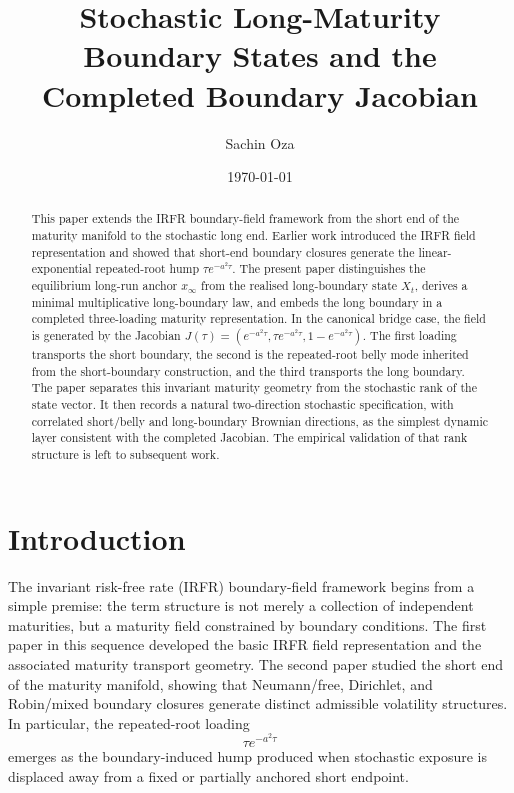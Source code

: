\documentclass[11pt]{article}
\title{Stochastic Long-Maturity Boundary States and the Completed Boundary Jacobian}
\author{Sachin Oza}
\date{\today}
\begin{document}
\maketitle

\begin{abstract}
This paper extends the IRFR boundary-field framework from the short end of the maturity manifold to the stochastic long end. Earlier work introduced the IRFR field representation and showed that short-end boundary closures generate the linear-exponential repeated-root hump \(\tau e^{-a^2\tau}\). The present paper distinguishes the equilibrium long-run anchor \(x_\infty\) from the realised long-boundary state \(X_t\), derives a minimal multiplicative long-boundary law, and embeds the long boundary in a completed three-loading maturity representation. In the canonical bridge case, the field is generated by the Jacobian \(J(\tau)=(e^{-a^2\tau},\tau e^{-a^2\tau},1-e^{-a^2\tau})\). The first loading transports the short boundary, the second is the repeated-root belly mode inherited from the short-boundary construction, and the third transports the long boundary. The paper separates this invariant maturity geometry from the stochastic rank of the state vector. It then records a natural two-direction stochastic specification, with correlated short/belly and long-boundary Brownian directions, as the simplest dynamic layer consistent with the completed Jacobian. The empirical validation of that rank structure is left to subsequent work.
\end{abstract}


\section{Introduction}

The invariant risk-free rate (IRFR) boundary-field framework begins from a simple premise: the term structure is not merely a collection of independent maturities, but a maturity field constrained by boundary conditions. The first paper in this sequence developed the basic IRFR field representation and the associated maturity transport geometry. The second paper studied the short end of the maturity manifold, showing that Neumann/free, Dirichlet, and Robin/mixed boundary closures generate distinct admissible volatility structures. In particular, the repeated-root loading
\[
\tau e^{-a^2\tau}
\]
emerges as the boundary-induced hump produced when stochastic exposure is displaced away from a fixed or partially anchored short endpoint.
\end{document}
